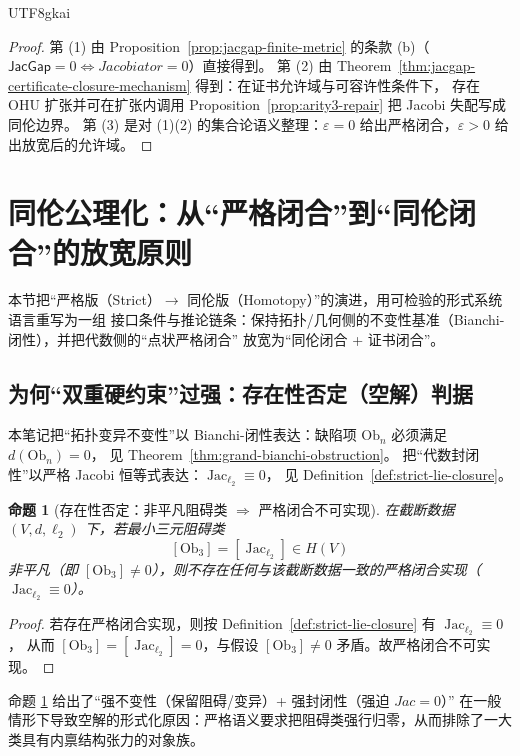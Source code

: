 \documentclass[12pt]{article}
\newtheorem{proposition}{命题}[section]
\newcommand{\Layer}{\ensuremath{\ell}}
\newcommand{\Jac}{\operatorname{Jac}}
\newcommand{\Ob}{\mathrm{Ob}}
\newcommand{\JacGap}{\ensuremath{\mathsf{JacGap}}}
\begin{document}
\begin{CJK*}{UTF8}{gkai}
\begin{proof}
第 (1) 由 Proposition~\ref{prop:jacgap-finite-metric} 的条款 (b)（$\JacGap=0\iff Jacobiator=0$）直接得到。
第 (2) 由 Theorem~\ref{thm:jacgap-certificate-closure-mechanism} 得到：在证书允许域与可容许性条件下，
存在 OHU 扩张并可在扩张内调用 Proposition~\ref{prop:arity3-repair} 把 Jacobi 失配写成同伦边界。
第 (3) 是对 (1)(2) 的集合论语义整理：$\varepsilon=0$ 给出严格闭合，$\varepsilon>0$ 给出放宽后的允许域。
\end{proof}

\section{同伦公理化：从“严格闭合”到“同伦闭合”的放宽原则}
\label{sec:homotopy-axiomatization}

本节把“严格版（Strict）$\rightarrow$ 同伦版（Homotopy）”的演进，用可检验的形式系统语言重写为一组
接口条件与推论链条：保持拓扑/几何侧的不变性基准（Bianchi-闭性），并把代数侧的“点状严格闭合”
放宽为“同伦闭合 + 证书闭合”。\cite{HomotopyMinimalityDialogue,GaoZheng2025GFramework}

\subsection{为何“双重硬约束”过强：存在性否定（空解）判据}

本笔记把“拓扑变异不变性”以 Bianchi-闭性表达：缺陷项 $\Ob_n$ 必须满足 $d(\Ob_n)=0$，
见 Theorem~\ref{thm:grand-bianchi-obstruction}。
把“代数封闭性”以严格 Jacobi 恒等式表达：$\Jac_{\Layer_2}\equiv 0$，
见 Definition~\ref{def:strict-lie-closure}。

\begin{proposition}[存在性否定：非平凡阻碍类 $\Rightarrow$ 严格闭合不可实现]
\label{prop:existential-negation-strict}
在截断数据 $(V,d,\Layer_2)$ 下，若最小三元阻碍类
\[
  [\Ob_3]=[\Jac_{\Layer_2}]\in H(V)
\]
非平凡（即 $[\Ob_3]\neq 0$），则不存在任何与该截断数据一致的严格闭合实现（$\Jac_{\Layer_2}\equiv 0$）。
\end{proposition}

\begin{proof}
若存在严格闭合实现，则按 Definition~\ref{def:strict-lie-closure} 有 $\Jac_{\Layer_2}\equiv 0$，
从而 $[\Ob_3]=[\Jac_{\Layer_2}]=0$，与假设 $[\Ob_3]\neq 0$ 矛盾。故严格闭合不可实现。
\end{proof}

命题 \ref{prop:existential-negation-strict} 给出了“强不变性（保留阻碍/变异）+ 强封闭性（强迫 $Jac=0$）”
在一般情形下导致空解的形式化原因：严格语义要求把阻碍类强行归零，从而排除了一大类具有内禀结构张力的对象族。
\cite{HomotopyMinimalityDialogue}


\end{CJK*}
\end{document}
